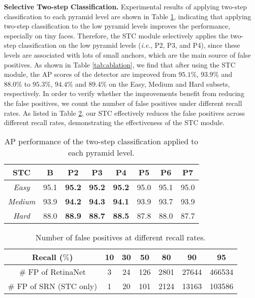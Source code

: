 \documentclass[letterpaper]{article} \usepackage{aaai19m}  \usepackage{times}  \usepackage{helvet}  \usepackage{courier}  \usepackage{url}  \usepackage{graphicx}  \usepackage{subfigure}
\def\ie{{\em i.e.}}
\begin{document}
{\flushleft \textbf{Selective Two-step Classification.} }
Experimental results of applying two-step classification to each pyramid level are shown in Table \ref{tab:stc_per_level}, indicating that applying two-step classification to the low pyramid levels improves the performance, especially on tiny faces. Therefore, the STC module selectively applies the two-step classification on the low pyramid levels (\ie, P2, P3, and P4), since these levels are associated with lots of small anchors, which are the main source of false positives. As shown in Table \ref{tab:ablation}, we find that after using the STC module, the AP scores of the detector are improved from $95.1\%$, $93.9\%$ and $88.0\%$ to $95.3\%$, $94.4\%$ and $89.4\%$ on the Easy, Medium and Hard subsets, respectively. In order to verify whether the improvements benefit from reducing the false positives, we count the number of false positives under different recall rates. As listed in Table \ref{tab:fp_num}, our STC effectively reduces the false positives across different recall rates, demonstrating the effectiveness of the STC module.

\vspace{-1.5mm}
\begin{table}[h]
\centering
\setlength{\tabcolsep}{3pt}
\caption{AP performance of the two-step classification applied to each pyramid level.}
\setlength{\tabcolsep}{5.2pt}
\begin{tabular}{c|c|cccccc}
\toprule[1.5pt]
STC & B & P2 & P3 & P4 & P5 & P6 & P7 \\
\hline
{\em Easy} & 95.1 & \bf 95.2 & \bf 95.2 & \bf 95.2 & 95.0 & 95.1 & 95.0 \\
{\em Medium} & 93.9 & \bf 94.2 & \bf 94.3 & \bf 94.1 & 93.9 & 93.7 & 93.9 \\
{\em Hard} & 88.0 & \bf 88.9 & \bf 88.7 & \bf 88.5 & 87.8 & 88.0 & 87.7 \\
\bottomrule[1.5pt]
\end{tabular}
\vspace{-5mm}
\label{tab:stc_per_level}
\end{table}

\begin{table}[h]
\centering
\setlength{\tabcolsep}{3pt}
\caption{Number of false positives at different recall rates.}
\setlength{\tabcolsep}{2.0pt}
\begin{tabular}{c|cccccc}
\toprule[1.5pt]
Recall ($\%$) & 10 & 30 & 50 & 80 & 90 & 95 \\
\hline
$\#$ FP of RetinaNet & 3 & 24 & 126 & 2801 & 27644 & 466534\\
$\#$ FP of SRN (STC only) & 1 & 20 & 101 & 2124 & 13163 & 103586\\
\bottomrule[1.5pt]
\end{tabular}
\vspace{-1.5mm}
\label{tab:fp_num}
\end{table}
\end{document}
